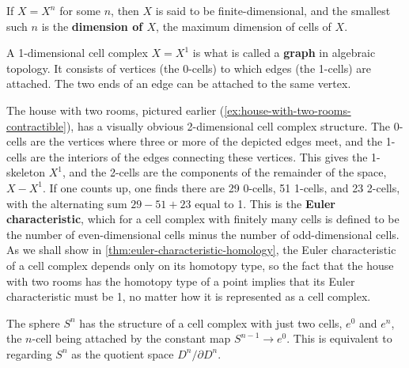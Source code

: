 \begin{definition}
\label{def:dimension-cw-complex}
If $X = X^n$ for some $n$, then $X$ is said to be finite-dimensional, and the smallest
such $n$ is the \textbf{dimension of $X$}, the maximum dimension of cells of $X$.
\end{definition}

\begin{example}
\label{ex:cw-graph}
\mathlibok
{}
A 1-dimensional cell complex $X = X^1$ is what is called a \textbf{graph} in algebraic
topology. It consists of vertices (the 0-cells) to which edges (the 1-cells) are attached.
The two ends of an edge can be attached to the same vertex.
\end{example}

\begin{example}
\label{ex:house-two-rooms-euler-characteristic}
The house with two rooms, pictured earlier (\cref{ex:house-with-two-rooms-contractible}),
has a visually obvious 2-dimensional cell complex structure. The 0-cells are the vertices
where three or more of the depicted edges meet, and the 1-cells are the interiors of the
edges connecting these vertices. This gives the 1-skeleton $X^1$, and the 2-cells are the
components of the remainder of the space, $X - X^1$. If one counts up, one finds there
are 29 0-cells, 51 1-cells, and 23 2-cells, with the alternating sum $29 - 51 + 23$ equal
to 1. This is the \textbf{Euler characteristic}, which for a cell complex with finitely many
cells is defined to be the number of even-dimensional cells minus the number of
odd-dimensional cells. As we shall show in \cref{thm:euler-characteristic-homology}, the Euler characteristic of a cell complex depends only on its homotopy
type, so the fact that the house with two rooms has the homotopy type of a point implies
that its Euler characteristic must be 1, no matter how it is represented as a cell complex.
\end{example}

\begin{example}
\label{ex:sphere-two-cells}
The sphere $S^n$ has the structure of a cell complex with just two cells, $e^0$ and
$e^n$, the $n$-cell being attached by the constant map $S^{n-1} \to e^0$. This is equivalent
to regarding $S^n$ as the quotient space $D^n / \partial D^n$.
\end{example}

